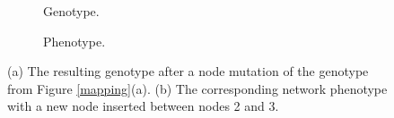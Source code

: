 \begin{figure}[htb]
    \begin{mdframed}
        \begin{subfigure}[b]{0.45\textwidth}
            \centering
            \resizebox{1\textwidth}{!}{}
            \caption{Genotype.}
            \label{node_genotype}
        \end{subfigure}
        \begin{subfigure}[b]{0.45\textwidth}
            \centering
            \resizebox{0.65\textwidth}{!}{}
            \caption{Phenotype.}
            \label{node_phenotype}
        \end{subfigure}
    \end{mdframed}
    \caption{ (a) The resulting genotype after a node mutation of the genotype from Figure \ref{mapping}(a). (b) The
    corresponding network phenotype with a new node inserted between nodes 2 and 3.}
    \label{node_mutation}
\end{figure}
